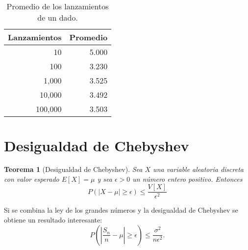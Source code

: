 \documentclass[12pt]{article}
\newtheorem{theorem}{Teorema}
\begin{document}
		\begin{table}[h]
		\caption{Promedio de los lanzamientos de un dado.}
		\label{dado}
		\centering
		\begin{tabular}{|r|r|}
			\hline
			\bf Lanzamientos & \bf Promedio \\
			\hline
			10 & 5.000 \\
			100 & 3.230 \\
			1,000 & 3.525 \\
			10,000 & 3.492 \\
			100,000 & 3.503 \\
			\hline
		\end{tabular}
	\end{table}

\section{Desigualdad de Chebyshev}

\begin{theorem}[Desigualdad de Chebyshev]
	Sea $X$ una variable aleatoria discreta con valor esperado $E[X] = \mu$ y sea $\epsilon >0$ un número entero positivo. Entonces
	\begin{equation*}
	P(|X-\mu| \geq \epsilon) \leq \frac{V[X]}{\epsilon^2}
	\end{equation*}
\end{theorem}
	
	Si se combina la ley de los grandes números y la desigualdad de Chebyshev se obtiene un resultado interesante:
	\begin{equation*}
		P(\left| \frac{S_n}{n} - \mu \right| \geq \epsilon) \leq \frac{\sigma^2}{n\epsilon^2}.
	\end{equation*}
	


\end{document}
